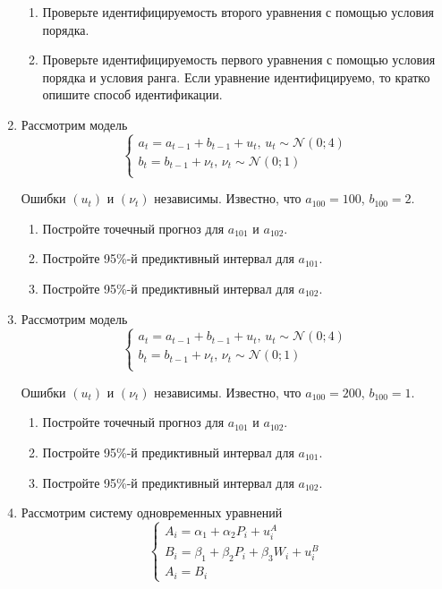 \documentclass[12pt]{article}
\def \cN{\mathcal{N}}
\theoremstyle{definition}
\begin{document}
\begin{enumerate}
\begin{enumerate}
  \item Проверьте идентифицируемость второго уравнения с помощью условия порядка.
  \item Проверьте идентифицируемость первого уравнения с помощью условия порядка и условия ранга.
  Если уравнение идентифицируемо, то кратко опишите способ идентификации.
\end{enumerate}


\newpage

\item Рассмотрим модель 
\[
\begin{cases}
  a_t = a_{t-1} + b_{t-1} + u_t, \, u_t \sim \cN(0; 4) \\
  b_t = b_{t-1} + \nu_t, \, \nu_t \sim \cN(0;1) \\
\end{cases}
\]

Ошибки $(u_t)$ и $(\nu_t)$ независимы. Известно, что $a_{100}=100$, $b_{100}=2$. 
\begin{enumerate}
  \item Постройте точечный прогноз для $a_{101}$ и $a_{102}$.
  \item Постройте 95\%-й предиктивный интервал для $a_{101}$.
  \item Постройте 95\%-й предиктивный интервал для $a_{102}$.
\end{enumerate}


\item Рассмотрим модель 
\[
\begin{cases}
  a_t = a_{t-1} + b_{t-1} + u_t, \, u_t \sim \cN(0; 4) \\
  b_t = b_{t-1} + \nu_t, \, \nu_t \sim \cN(0;1) \\
\end{cases}
\]

Ошибки $(u_t)$ и $(\nu_t)$ независимы. Известно, что $a_{100}=200$, $b_{100}=1$. 
\begin{enumerate}
  \item Постройте точечный прогноз для $a_{101}$ и $a_{102}$.
  \item Постройте 95\%-й предиктивный интервал для $a_{101}$.
  \item Постройте 95\%-й предиктивный интервал для $a_{102}$.
\end{enumerate}

\item Рассмотрим систему одновременных уравнений
\[
\begin{cases}
A_i = \alpha_1 + \alpha_2 P_i + u_i^A \\
B_i = \beta_1 + \beta_2 P_i + \beta_3 W_i + u_i^B \\
A_i = B_i
\end{cases}
\]


\end{enumerate}
\end{document}

